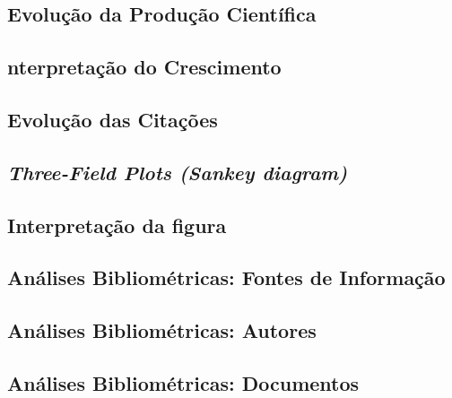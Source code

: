      
\subsection{Evolução da Produção Científica}
     
\subsection{nterpretação do Crescimento}

\subsection{Evolução das Citações}

\subsection{\textit{Three-Field Plots (Sankey diagram)} \label{MASSA:Sankey}}

\subsection{Interpretação da figura}

\subsection{Análises Bibliométricas: Fontes de Informação}

\subsection{Análises Bibliométricas: Autores}

\subsection{Análises Bibliométricas: Documentos}